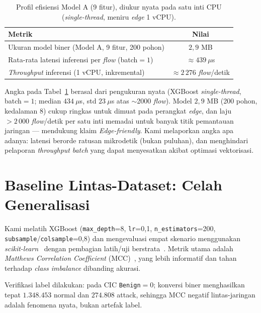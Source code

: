 \documentclass[11pt,a4paper]{article}
\begin{document}
\begin{table}[h]
\centering
\caption{Profil efisiensi Model A (9 fitur), diukur nyata pada satu inti CPU
(\emph{single-thread}, meniru \emph{edge} 1 vCPU).}
\label{tab:efficiency}
\begin{tabular}{lc}
\toprule
Metrik & Nilai \\
\midrule
Ukuran model biner (Model A, 9 fitur, 200 pohon) & $2{,}9$ MB \\
Rata-rata latensi inferensi per \emph{flow} (batch$=1$) & $\approx 439\ \mu$s \\
\emph{Throughput} inferensi (1 vCPU, inkremental) & $\approx 2\,276$ \emph{flow}/detik \\
\bottomrule
\end{tabular}
\end{table}

\noindent Angka pada Tabel~\ref{tab:efficiency} berasal dari pengukuran nyata
(XGBoost \emph{single-thread}, batch$=1$; median $434\ \mu$s, std $23\ \mu$s atas
$\sim$2000 \emph{flow}). Model $2{,}9$ MB (200 pohon, kedalaman 8) cukup ringkas
untuk dimuat pada perangkat \emph{edge}, dan laju $>2\,000$ \emph{flow}/detik per
satu inti memadai untuk banyak titik pemantauan jaringan --- mendukung klaim
\emph{Edge-friendly}. Kami melaporkan angka apa adanya: latensi berorde ratusan
mikrodetik (bukan puluhan), dan menghindari pelaporan \emph{throughput} \emph{batch}
yang dapat menyesatkan akibat optimasi vektorisasi.

\section{Baseline Lintas-Dataset: Celah Generalisasi}
\label{sec:baseline}

Kami melatih XGBoost (\texttt{max\_depth}=8, \texttt{lr}=0{,}1,
\texttt{n\_estimators}=200, \texttt{subsample}/\texttt{colsample}=0{,}8) dan
mengevaluasi empat skenario menggunakan \emph{scikit-learn}~\cite{sklearn} dengan
pembagian latih/uji berstrata~\cite{kohavi}. Metrik utama adalah \emph{Matthews
Correlation Coefficient} (MCC)~\cite{matthews,chicco}, yang lebih informatif dan
tahan terhadap \emph{class imbalance} dibanding akurasi.

Verifikasi label dilakukan: pada CIC \texttt{Benign}$=0$; konversi biner
menghasilkan tepat $1{.}348{.}453$ normal dan $274{.}808$ attack, sehingga MCC
negatif lintas-jaringan adalah fenomena nyata, bukan artefak label.
\end{document}

